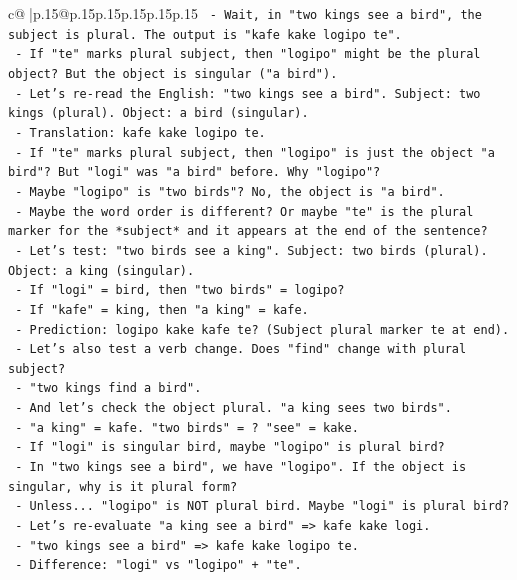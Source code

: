 \documentclass{article}
\begin{document}
{\begin{supertabular}{c@{$\;$}|p{.15\linewidth}@{}p{.15\linewidth}p{.15\linewidth}p{.15\linewidth}p{.15\linewidth}p{.15\linewidth}}
{{{\texttt{  {-} Wait, in "two kings see a bird", the subject is plural. The output is "kafe kake logipo te".} \\
\texttt{  {-} If "te" marks plural subject, then "logipo" might be the plural object? But the object is singular ("a bird").} \\
\texttt{  {-} Let's re{-}read the English: "two kings see a bird". Subject: two kings (plural). Object: a bird (singular).} \\
\texttt{  {-} Translation: kafe kake logipo te.} \\
\texttt{  {-} If "te" marks plural subject, then "logipo" is just the object "a bird"? But "logi" was "a bird" before. Why "logipo"?} \\
\texttt{  {-} Maybe "logipo" is "two birds"? No, the object is "a bird".} \\
\texttt{  {-} Maybe the word order is different? Or maybe "te" is the plural marker for the *subject* and it appears at the end of the sentence?} \\
\texttt{  {-} Let's test: "two birds see a king". Subject: two birds (plural). Object: a king (singular).} \\
\texttt{  {-} If "logi" = bird, then "two birds" = logipo?} \\
\texttt{  {-} If "kafe" = king, then "a king" = kafe.} \\
\texttt{  {-} Prediction: logipo kake kafe te? (Subject plural marker te at end).} \\
\texttt{  {-} Let's also test a verb change. Does "find" change with plural subject?} \\
\texttt{  {-} "two kings find a bird".} \\
\texttt{  {-} And let's check the object plural. "a king sees two birds".} \\
\texttt{  {-} "a king" = kafe. "two birds" = ? "see" = kake.} \\
\texttt{  {-} If "logi" is singular bird, maybe "logipo" is plural bird?} \\
\texttt{  {-} In "two kings see a bird", we have "logipo". If the object is singular, why is it plural form?} \\
\texttt{  {-} Unless... "logipo" is NOT plural bird. Maybe "logi" is plural bird?} \\
\texttt{  {-} Let's re{-}evaluate "a king see a bird" => kafe kake logi.} \\
\texttt{  {-} "two kings see a bird" => kafe kake logipo te.} \\
\texttt{  {-} Difference: "logi" vs "logipo" + "te".} \\
}}}
\end{supertabular}}
\end{document}
